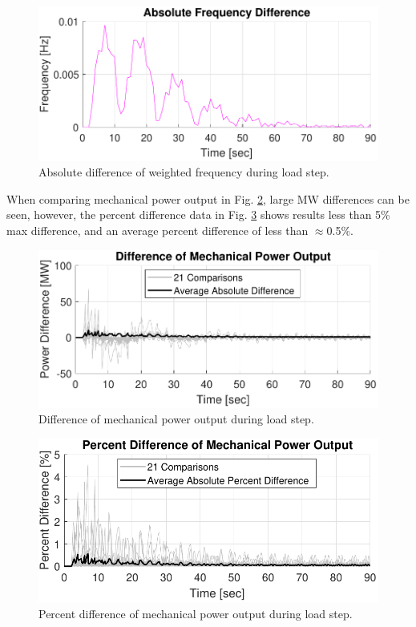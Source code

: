 \begin{figure}[!t]
	\centering
	\includegraphics[width=\linewidth]{figures/miniWECC3ALTDstepRelF}
	\caption{Absolute difference of weighted frequency during load step.}
	\label{fig: stepFdif}
\end{figure}

When comparing mechanical power output in Fig. \ref{fig: stepPmdif}, large MW differences can be seen, however, the percent difference data in Fig. \ref{fig: stepPmPercentdif} shows results less than 5\% max difference, and an average percent difference of less than $\approx$0.5\%.

\begin{figure}[!ht]
	\centering
	\includegraphics[width=\linewidth]{figures/miniWECC3ALTDstepPm2}
	\caption{Difference of mechanical power output during load step.}
	\label{fig: stepPmdif}
\end{figure}

\begin{figure}[!ht]
	\centering
	\includegraphics[width=\linewidth]{figures/miniWECC3ALTDstepPm3}
	\caption{Percent difference of mechanical power output during load step.}
	\label{fig: stepPmPercentdif}
\end{figure}


